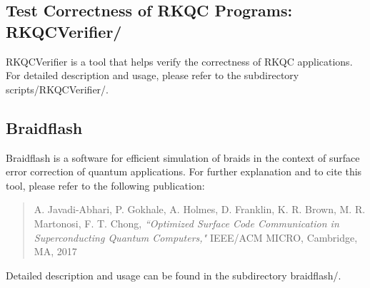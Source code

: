\subsection{Test Correctness of RKQC Programs: RKQCVerifier/}

RKQCVerifier is a tool that helps verify the correctness of RKQC applications. For detailed description and usage, please refer to the subdirectory scripts/RKQCVerifier/.

\subsection{Braidflash}

Braidflash is a software for efficient simulation of braids in the context of surface error correction of quantum applications. For further explanation and to cite this tool, please refer to the following publication:

\begin{quote}
A. Javadi-Abhari, P. Gokhale, A. Holmes, D. Franklin, K. R. Brown, M. R. Martonosi, F. T. Chong, {\em``Optimized Surface Code Communication in Superconducting Quantum Computers,"} IEEE/ACM MICRO, Cambridge, MA, 2017
\end{quote}

Detailed description and usage can be found in the subdirectory braidflash/.
